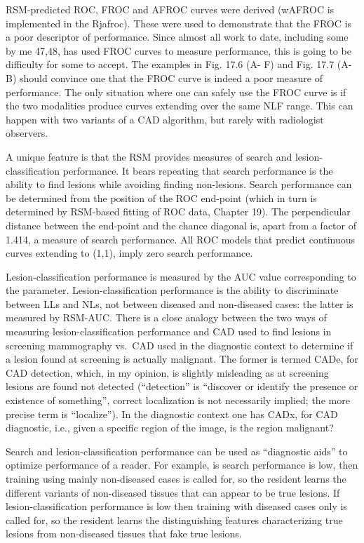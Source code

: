 \documentclass[
]{book}
\begin{document}
RSM-predicted ROC, FROC and AFROC curves were derived (wAFROC is implemented in the Rjafroc). These were used to demonstrate that the FROC is a poor descriptor of performance. Since almost all work to date, including some by me 47,48, has used FROC curves to measure performance, this is going to be difficulty for some to accept. The examples in Fig. 17.6 (A- F) and Fig. 17.7 (A-B) should convince one that the FROC curve is indeed a poor measure of performance. The only situation where one can safely use the FROC curve is if the two modalities produce curves extending over the same NLF range. This can happen with two variants of a CAD algorithm, but rarely with radiologist observers.

A unique feature is that the RSM provides measures of search and lesion-classification performance. It bears repeating that search performance is the ability to find lesions while avoiding finding non-lesions. Search performance can be determined from the position of the ROC end-point (which in turn is determined by RSM-based fitting of ROC data, Chapter 19). The perpendicular distance between the end-point and the chance diagonal is, apart from a factor of 1.414, a measure of search performance. All ROC models that predict continuous curves extending to (1,1), imply zero search performance.

Lesion-classification performance is measured by the AUC value corresponding to the parameter. Lesion-classification performance is the ability to discriminate between LLs and NLs, not between diseased and non-diseased cases: the latter is measured by RSM-AUC. There is a close analogy between the two ways of measuring lesion-classification performance and CAD used to find lesions in screening mammography vs.~CAD used in the diagnostic context to determine if a lesion found at screening is actually malignant. The former is termed CADe, for CAD detection, which, in my opinion, is slightly misleading as at screening lesions are found not detected (``detection'' is ``discover or identify the presence or existence of something'', correct localization is not necessarily implied; the more precise term is ``localize''). In the diagnostic context one has CADx, for CAD diagnostic, i.e., given a specific region of the image, is the region malignant?

Search and lesion-classification performance can be used as ``diagnostic aids'' to optimize performance of a reader. For example, is search performance is low, then training using mainly non-diseased cases is called for, so the resident learns the different variants of non-diseased tissues that can appear to be true lesions. If lesion-classification performance is low then training with diseased cases only is called for, so the resident learns the distinguishing features characterizing true lesions from non-diseased tissues that fake true lesions.
\end{document}

